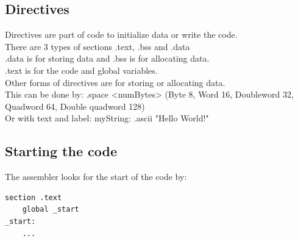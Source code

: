 \documentclass[12pt, a4paper]{article}
\begin{document}
		\subsection{Directives}
			Directives are part of code to initialize data or write the code.\\
			There are 3 types of sections .text, .bss and .data\\
			.data is for storing data and .bss is for allocating data.\\
			.text is for the code and global variables.\\
			Other forms of directives are for storing or allocating data.\\
			This can be done by: .space <numBytes> (Byte 8, Word 16, Doubleword 32, Quadword 64, Double quadword 128)\\
			Or with text and label: myString: .ascii "Hello World!"
		\subsection{Starting the code}
			The assembler looks for the start of the code by:\\
			\begin{lstlisting}[language={[x86masm]Assembler}]
section .text
	global _start
_start:
	...\end{lstlisting}
\end{document}
